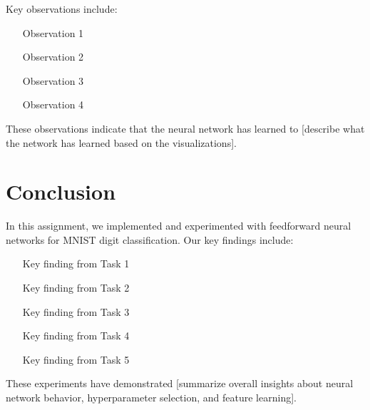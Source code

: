 \documentclass[12pt]{article}
\begin{document}
Key observations include:
\begin{itemize}
    \item [Observation 1]
    \item [Observation 2]
    \item [Observation 3]
    \item [Observation 4]
\end{itemize}

These observations indicate that the neural network has learned to [describe what the network has learned based on the visualizations].

\section{Conclusion}

In this assignment, we implemented and experimented with feedforward neural networks for MNIST digit classification. Our key findings include:

\begin{itemize}
    \item [Key finding from Task 1]
    \item [Key finding from Task 2]
    \item [Key finding from Task 3]
    \item [Key finding from Task 4]
    \item [Key finding from Task 5]
\end{itemize}

These experiments have demonstrated [summarize overall insights about neural network behavior, hyperparameter selection, and feature learning].
\end{document}
